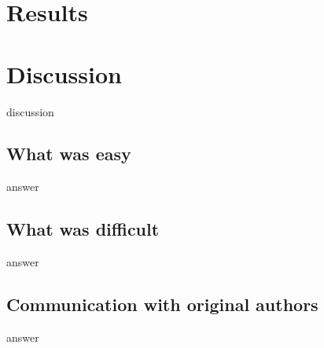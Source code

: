 %
%    
    


\section{Results}




\section{Discussion}
discussion

\subsection{What was easy}
answer

\subsection{What was difficult}
answer

\subsection{Communication with original authors}
answer